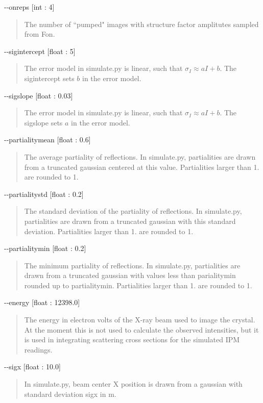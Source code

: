 \documentclass{report}
\begin{document}
\noindent
-{}-onreps [int : 4]
\begin{quote}
    The number of ``pumped" images with structure factor amplitutes sampled from Fon. 
\end{quote}

\noindent
-{}-sigintercept [float : 5]
\begin{quote}
    The error model in simulate.py is linear, such that $\sigma_I \approx aI + b$. 
    The sigintercept sets $b$ in the error model. 
\end{quote}

\noindent
-{}-sigslope [float : 0.03]
\begin{quote}
    The error model in simulate.py is linear, such that $\sigma_I \approx aI + b$. 
    The sigslope sets $a$ in the error model. 
\end{quote}

\noindent
-{}-partialitymean [float : 0.6]
\begin{quote}
    The average partiality of reflections.
    In simulate.py, partialities are drawn from a truncated gaussian centered at this value. 
    Partialities larger than 1. are rounded to 1. 
\end{quote}

\noindent
-{}-partialitystd [float : 0.2]
\begin{quote}
    The standard deviation of the partiality of reflections.
    In simulate.py, partialities are drawn from a truncated gaussian with this standard deviation.
    Partialities larger than 1. are rounded to 1. 
\end{quote}

\noindent
-{}-partialitymin [float : 0.2]
\begin{quote}
    The minimum partiality of reflections.
    In simulate.py, partialities are drawn from a truncated gaussian with values less than parialitymin rounded up to partialitymin.
    Partialities larger than 1. are rounded to 1. 
\end{quote}

\noindent
-{}-energy [float : 12398.0]
\begin{quote}
    The energy in electron volts of the X-ray beam used to image the crystal. 
    At the moment this is not used to calculate the observed intensities, but it is used in integrating scattering cross sections for the simulated IPM readings.
\end{quote}

\noindent
-{}-sigx [float : 10.0]
\begin{quote}
    In simulate.py, beam center X position is drawn from a gaussian with standard deviation sigx in \textmu m. 
\end{quote}
\end{document}
